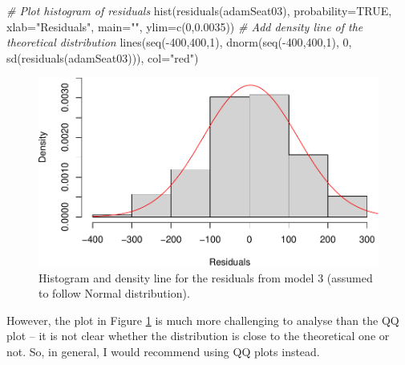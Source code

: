 \documentclass[
]{book}
\newenvironment{Shaded}{\begin{snugshade}}{\end{snugshade}}
\newcommand{\AttributeTok}[1]{\textcolor[rgb]{0.77,0.63,0.00}{#1}}
\newcommand{\CommentTok}[1]{\textcolor[rgb]{0.56,0.35,0.01}{\textit{#1}}}
\newcommand{\ConstantTok}[1]{\textcolor[rgb]{0.00,0.00,0.00}{#1}}
\newcommand{\DecValTok}[1]{\textcolor[rgb]{0.00,0.00,0.81}{#1}}
\newcommand{\FloatTok}[1]{\textcolor[rgb]{0.00,0.00,0.81}{#1}}
\newcommand{\FunctionTok}[1]{\textcolor[rgb]{0.00,0.00,0.00}{#1}}
\newcommand{\NormalTok}[1]{#1}
\newcommand{\SpecialCharTok}[1]{\textcolor[rgb]{0.00,0.00,0.00}{#1}}
\newcommand{\StringTok}[1]{\textcolor[rgb]{0.31,0.60,0.02}{#1}}
\theoremstyle{definition}
\theoremstyle{definition}
\theoremstyle{definition}
\theoremstyle{definition}
\theoremstyle{remark}
\begin{document}
\begin{Shaded}
\begin{Highlighting}[]
\CommentTok{\# Plot histogram of residuals}
\FunctionTok{hist}\NormalTok{(}\FunctionTok{residuals}\NormalTok{(adamSeat03), }\AttributeTok{probability=}\ConstantTok{TRUE}\NormalTok{,}
     \AttributeTok{xlab=}\StringTok{"Residuals"}\NormalTok{, }\AttributeTok{main=}\StringTok{""}\NormalTok{, }\AttributeTok{ylim=}\FunctionTok{c}\NormalTok{(}\DecValTok{0}\NormalTok{,}\FloatTok{0.0035}\NormalTok{))}
\CommentTok{\# Add density line of the theoretical distribution}
\FunctionTok{lines}\NormalTok{(}\FunctionTok{seq}\NormalTok{(}\SpecialCharTok{{-}}\DecValTok{400}\NormalTok{,}\DecValTok{400}\NormalTok{,}\DecValTok{1}\NormalTok{),}
      \FunctionTok{dnorm}\NormalTok{(}\FunctionTok{seq}\NormalTok{(}\SpecialCharTok{{-}}\DecValTok{400}\NormalTok{,}\DecValTok{400}\NormalTok{,}\DecValTok{1}\NormalTok{), }\DecValTok{0}\NormalTok{, }\FunctionTok{sd}\NormalTok{(}\FunctionTok{residuals}\NormalTok{(adamSeat03))),}
      \AttributeTok{col=}\StringTok{"red"}\NormalTok{)}
\end{Highlighting}
\end{Shaded}

\begin{figure}
\centering
\includegraphics{Svetunkov--2022----ADAM_files/figure-latex/adamSeat3Density-1.pdf}
\caption{\label{fig:adamSeat3Density}Histogram and density line for the residuals from model 3 (assumed to follow Normal distribution).}
\end{figure}

However, the plot in Figure \ref{fig:adamSeat3Density} is much more challenging to analyse than the QQ plot -- it is not clear whether the distribution is close to the theoretical one or not. So, in general, I would recommend using QQ plots instead.
\end{document}
